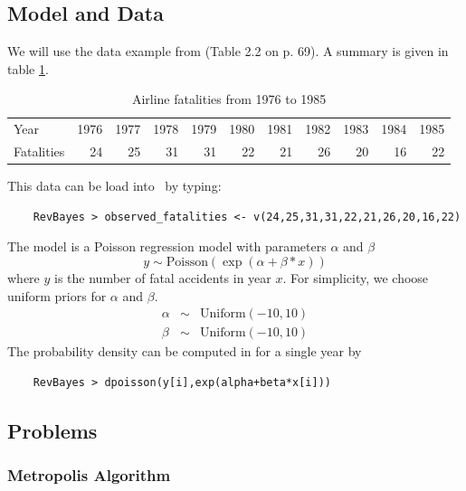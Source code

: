 \documentclass[11pt]{article}
\begin{document}
\subsection*{Model and Data}
We will use the data example from \cite{gelman95} (Table 2.2 on p. 69). 
A summary is given in table \ref{tab:airlineFatalities}.
\begin{table}[!hbtp]
\caption{Airline fatalities from 1976 to 1985}
\label{tab:airlineFatalities}
\smallskip
\begin{tabular}{ l | r r r r r r r r r r }
  \hline                       
  Year & 1976 & 1977 & 1978 & 1979 & 1980 & 1981 & 1982 & 1983 & 1984 & 1985 \\
  Fatalities & 24 & 25 & 31 & 31 & 22 & 21 & 26 & 20 & 16 & 22\\
  \hline  
\end{tabular}
\end{table}
This data can be load into \RevBayes~by typing:
{\tt \begin{snugshade*}
\begin{lstlisting}    
    RevBayes > observed_fatalities <- v(24,25,31,31,22,21,26,20,16,22)
\end{lstlisting}
\end{snugshade*}}

The model is a Poisson regression model with parameters $\alpha$ and $\beta$
\begin{equation*}
y \sim \text{Poisson}(\exp(\alpha+\beta*x))
\end{equation*} 
where $y$ is the number of fatal accidents in year $x$. 
For simplicity, we choose uniform priors for $\alpha$ and $\beta$.
\begin{eqnarray*}
\alpha & \sim & \text{Uniform}(-10,10)\\
\beta &  \sim & \text{Uniform}(-10,10)
\end{eqnarray*}
The probability density can be computed in \RevBayes for a single year by
{\tt \begin{snugshade*}
\begin{lstlisting}    
    RevBayes > dpoisson(y[i],exp(alpha+beta*x[i]))
\end{lstlisting}
\end{snugshade*}}

\subsection*{Problems}

\subsubsection*{Metropolis Algorithm}%
\end{document}
